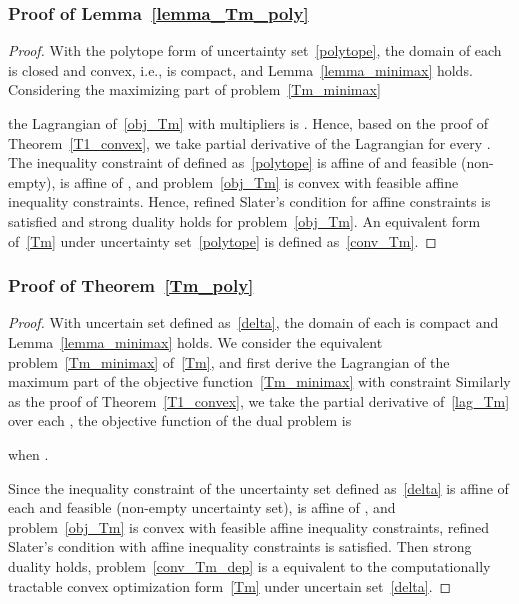\documentclass[10pt,twocolumn,twoside,english]{IEEEtran}
\begin{document}
\subsubsection{Proof of Lemma~\ref{lemma_Tm_poly}}
\label{appendix_Tm_poly1}
\begin{proof}
With the polytope form of uncertainty set~\eqref{polytope}, the domain of each  is closed and convex, i.e., is compact, and Lemma~\ref{lemma_minimax} holds. Considering the maximizing part of problem~\eqref{Tm_minimax}

the Lagrangian of~\eqref{obj_Tm} with multipliers  is .
Hence, based on the proof of Theorem~\ref{T1_convex}, we take partial derivative of the Lagrangian for every . The inequality constraint of  defined as~\eqref{polytope} is affine of  and feasible (non-empty),  is affine of , and problem~\eqref{obj_Tm} is convex with feasible affine inequality constraints. Hence, refined Slater's condition for affine constraints is satisfied and strong duality holds for problem~\eqref{obj_Tm}. An equivalent form of~\eqref{Tm} under uncertainty set~\eqref{polytope} is defined as~\eqref{conv_Tm}.
\end{proof}

\subsubsection{Proof of Theorem~\ref{Tm_poly}}
\label{appendix_Tm_poly2}
\begin{proof}
With uncertain set defined as~\eqref{delta}, the domain of each  is compact and Lemma~\ref{lemma_minimax} holds. We consider the equivalent problem~\eqref{Tm_minimax} of~\eqref{Tm}, and first derive the Lagrangian of the maximum part of the objective function~\eqref{Tm_minimax} with constraint 
Similarly as the proof of Theorem~\ref{T1_convex}, we take the partial derivative of~\eqref{lag_Tm} over each , the objective function of the dual problem is 

when .




Since the inequality constraint of the uncertainty set defined as~\eqref{delta} is affine of each  and feasible (non-empty uncertainty set),  is affine of , and problem~\eqref{obj_Tm} is convex with feasible affine inequality constraints, refined Slater's condition with affine inequality constraints is satisfied. Then strong duality holds, problem~\eqref{conv_Tm_dep} is a equivalent to the computationally tractable convex optimization form~\eqref{Tm} under uncertain set~\eqref{delta}.
\end{proof}
\end{document}
